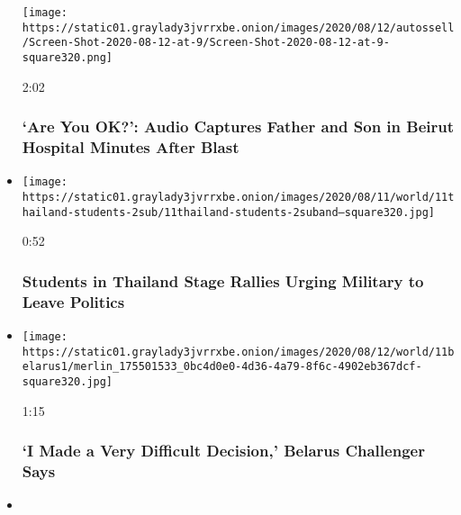 \begin{itemize}
  \texttt{[image: https://static01.graylady3jvrrxbe.onion/images/2020/08/12/autossell/Screen-Shot-2020-08-12-at-9/Screen-Shot-2020-08-12-at-9-square320.png]}

  2:02

  \hypertarget{are-you-ok-audio-captures-father-and-son-in-beirut-hospital-minutes-after-blast}{%
  \subsubsection{`Are You OK?': Audio Captures Father and Son in Beirut
  Hospital Minutes After
  Blast}\label{are-you-ok-audio-captures-father-and-son-in-beirut-hospital-minutes-after-blast}}
\item
  \href{https://www.nytimes3xbfgragh.onion/video/us/politics/100000007283595/student-protest-thailand.html?action=click\&module=video-series-bar\&region=header\&pgtype=Article\&playlistId=video/world}{}

  \texttt{[image: https://static01.graylady3jvrrxbe.onion/images/2020/08/11/world/11thailand-students-2sub/11thailand-students-2suband--square320.jpg]}

  0:52

  \hypertarget{students-in-thailand-stage-rallies-urging-military-to-leave-politics}{%
  \subsubsection{Students in Thailand Stage Rallies Urging Military to
  Leave
  Politics}\label{students-in-thailand-stage-rallies-urging-military-to-leave-politics}}
\item
  \href{https://www.nytimes3xbfgragh.onion/video/world/100000007283284/belarus-elections.html?action=click\&module=video-series-bar\&region=header\&pgtype=Article\&playlistId=video/world}{}

  \texttt{[image: https://static01.graylady3jvrrxbe.onion/images/2020/08/12/world/11belarus1/merlin\_175501533\_0bc4d0e0-4d36-4a79-8f6c-4902eb367dcf-square320.jpg]}

  1:15

  \hypertarget{i-made-a-very-difficult-decision-belarus-challenger-says}{%
  \subsubsection{`I Made a Very Difficult Decision,' Belarus Challenger
  Says}\label{i-made-a-very-difficult-decision-belarus-challenger-says}}
\item
  \href{https://www.nytimes3xbfgragh.onion/video/world/europe/100000007282371/boris-moral-duty-reopen-schools.html?action=click\&module=video-series-bar\&region=header\&pgtype=Article\&playlistId=video/world}{}


\end{itemize}

